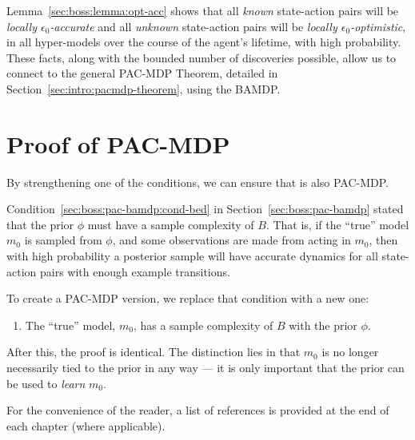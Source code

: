 Lemma~\ref{sec:boss:lemma:opt-acc} shows that all \emph{known} state-action pairs will be \emph{locally $\epsilon_0$-accurate} and all \emph{unknown} state-action pairs will be \emph{locally $\epsilon_0$-optimistic}, in all hyper-models over the course of the agent's lifetime, with high probability. These facts, along with the bounded number of discoveries possible, allow us to connect  to the general PAC-MDP Theorem, detailed in Section~\ref{sec:intro:pacmdp-theorem}, using the BAMDP.




\section{Proof of PAC-MDP}

By strengthening one of the conditions, we can ensure that  is also PAC-MDP.

Condition~\ref{sec:boss:pac-bamdp:cond-bed} in Section~\ref{sec:boss:pac-bamdp} stated that the prior $\phi$ must have a sample complexity of $B$. That is, if the ``true'' model $m_0$ is sampled from $\phi$, and some observations are made from acting in $m_0$, then with high probability a posterior sample will have accurate dynamics for all state-action pairs with enough example transitions.

To create a PAC-MDP version, we replace that condition with a new one:
\begin{enumerate}
\item The ``true'' model, $m_0$, has a sample complexity of $B$ with the prior $\phi$.
\end{enumerate}
After this, the proof is identical. The distinction lies in that $m_0$ is no longer necessarily tied to the prior in any way --- it is only important that the prior can be used to \emph{learn} $m_0$.

%
\ifperchapterbib%
For the convenience of the reader, a list of references is provided at the end of each chapter (where applicable).
\ifendbib%
\else\fi%
\else\fi%
